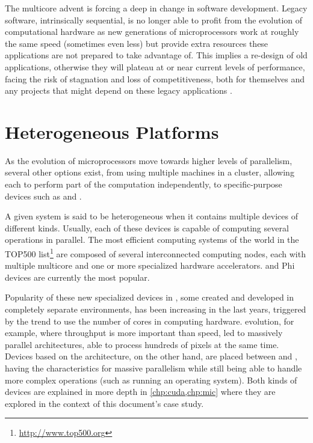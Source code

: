 \documentclass[../thesis]{subfiles}
\begin{document}
	The multicore advent is forcing a deep in change in software development. Legacy software, intrinsically sequential, is no longer able to profit from the evolution of computational hardware as new generations of microprocessors work at roughly the same speed (sometimes even less) but provide extra resources these applications are not prepared to take advantage of. This implies a re-design of old applications, otherwise they will plateau at or near current levels of performance, facing the risk of stagnation and loss of competitiveness, both for themselves and any projects that might depend on these legacy applications \cite{Farber:2011:RedefiningWhatIsPossible}.

		\section{Heterogeneous Platforms}
		As the evolution of microprocessors move towards higher levels of parallelism, several other options exist, from using multiple machines in a cluster, allowing each to perform part of the computation independently, to specific-purpose devices such as \dsps and \gpus.

		A given system is said to be heterogeneous when it contains multiple devices of different kinds. Usually, each of these devices is capable of computing several operations in parallel. The most efficient computing systems of the world in the TOP500 list\footnote{\url{http://www.top500.org}} are composed of several interconnected computing nodes, each with multiple multicore \cpus and one or more specialized hardware accelerators. \gpus and \intel\xeon Phi devices are currently the most popular.

		Popularity of these new specialized devices in \hpc, some created and developed in completely separate environments, has been increasing in the last years, triggered by the trend to use the number of cores in computing hardware. \gpus evolution, for example, where throughput is more important than speed, led to massively parallel architectures, able to process hundreds of pixels at the same time. Devices based on the \intel\mic architecture, on the other hand, are placed between \gpus and \cpus, having the characteristics for massive parallelism while still being able to handle more complex operations (such as running an operating system). Both kinds of devices are explained in more depth in \cref{chp:cuda,chp:mic} where they are explored in the context of this document's case study.
\end{document}

